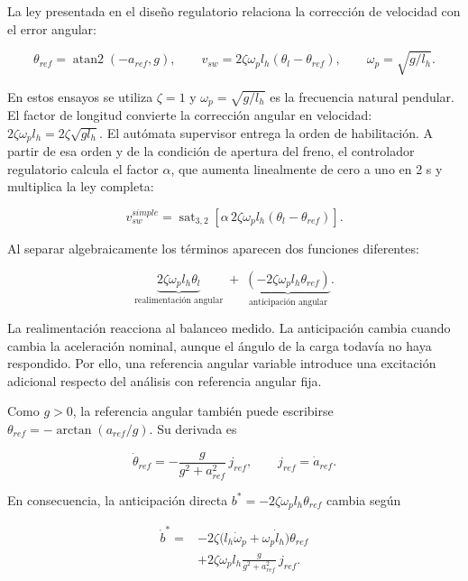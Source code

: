 \documentclass[a4paper,10pt,onecolumn,journal]{ieeeconf}
\numberwithin{equation}{section}
\begin{document}
La ley presentada en el diseño regulatorio relaciona la corrección de velocidad con el error angular:

\begin{equation}
\theta_{ref}=\operatorname{atan2}(-a_{ref},g),\qquad
v_{sw}=2\zeta\omega_p l_h(\theta_l-\theta_{ref}),\qquad
\omega_p=\sqrt{g/l_h}.
\end{equation}

En estos ensayos se utiliza $\zeta=1$ y $\omega_p=\sqrt{g/l_h}$ es la frecuencia natural pendular. El factor de longitud convierte la corrección angular en velocidad: $2\zeta\omega_p l_h=2\zeta\sqrt{gl_h}$. El autómata supervisor entrega la orden de habilitación. A partir de esa orden y de la condición de apertura del freno, el controlador regulatorio calcula el factor $\alpha$, que aumenta linealmente de cero a uno en 2 s y multiplica la ley completa:

\begin{equation}
v_{sw}^{simple}=\operatorname{sat}_{3,2}\left[\alpha\,2\zeta\omega_p l_h(\theta_l-\theta_{ref})\right].
\end{equation}

Al separar algebraicamente los términos aparecen dos funciones diferentes:

\begin{equation}
\underbrace{2\zeta\omega_p l_h\theta_l}_{\text{realimentación angular}}
\; + \;
\underbrace{(-2\zeta\omega_p l_h\theta_{ref})}_{\text{anticipación angular}}.
\end{equation}

La realimentación reacciona al balanceo medido. La anticipación cambia cuando cambia la aceleración nominal, aunque el ángulo de la carga todavía no haya respondido. Por ello, una referencia angular variable introduce una excitación adicional respecto del análisis con referencia angular fija.

Como $g>0$, la referencia angular también puede escribirse $\theta_{ref}=-\arctan(a_{ref}/g)$. Su derivada es

\begin{equation}
\dot\theta_{ref}=-\frac{g}{g^2+a_{ref}^2}\,j_{ref},\qquad
j_{ref}=\dot a_{ref}.
\end{equation}

En consecuencia, la anticipación directa $b^*=-2\zeta\omega_p l_h\theta_{ref}$ cambia según

\begin{equation}
\begin{aligned}
\dot b^*={}&-2\zeta\big(l_h\dot\omega_p+\omega_p\dot l_h\big)\theta_{ref}\\
&+2\zeta\omega_p l_h\frac{g}{g^2+a_{ref}^2}\,j_{ref}.
\end{aligned}
\end{equation}
\end{document}
